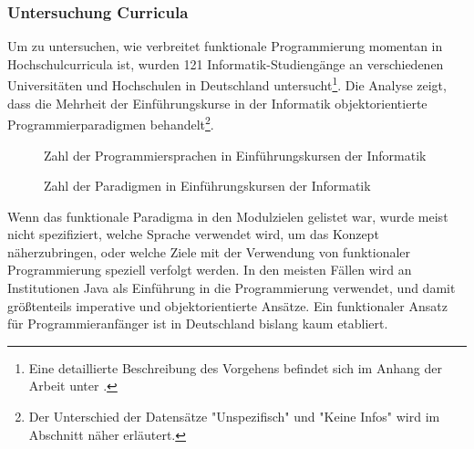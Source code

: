 \subsubsection{Untersuchung Curricula}\label{sec:curriculares}
Um zu untersuchen, wie verbreitet funktionale Programmierung momentan in Hochschulcurricula ist, wurden 121 Informatik-Studiengänge an verschiedenen Universitäten und Hochschulen in Deutschland untersucht\footnote{Eine detaillierte Beschreibung des Vorgehens befindet sich im Anhang der Arbeit unter .}.
Die Analyse zeigt, dass die Mehrheit der Einführungskurse in der Informatik objektorientierte Programmierparadigmen behandelt\footnote{Der Unterschied der Datensätze "Unspezifisch" und "Keine Infos" wird im Abschnitt  näher erläutert.}.

\begin{figure}[H]
    \centering
    
    \caption{Zahl der Programmiersprachen in Einführungskursen der Informatik}
\end{figure}

\begin{figure}[H]
    \centering
    
    \caption{Zahl der Paradigmen in Einführungskursen der Informatik}
\end{figure}

Wenn das funktionale Paradigma in den Modulzielen gelistet war, wurde meist nicht spezifiziert, welche Sprache verwendet wird, um das Konzept näherzubringen, oder welche Ziele mit der Verwendung von funktionaler Programmierung speziell verfolgt werden.
In den meisten Fällen wird an Institutionen Java als Einführung in die Programmierung verwendet, und damit größtenteils imperative und objektorientierte Ansätze.
Ein funktionaler Ansatz für Programmieranfänger ist in Deutschland bislang kaum etabliert.
